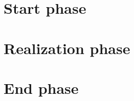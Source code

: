 \documentclass{report}
\begin{document}
	
	\section{Start phase}
	
	\section{Realization phase}
	
	
	\section{End phase}\label{end_phase}
	
\end{document}
